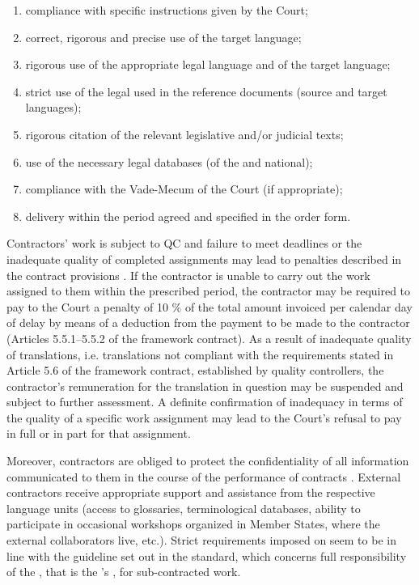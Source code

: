 \documentclass[output=paper]{langsci/langscibook}
\begin{document}
\begin{enumerate}
\item 
compliance with specific instructions given by the Court;
\item 
correct, rigorous and precise use of the target language;
\item 
rigorous use of the appropriate legal language and  of the target language;
\item 
strict use of the legal  used in the reference documents (source and target languages);
\item 
rigorous citation of the relevant legislative and/or judicial texts;
\item 
use of the necessary legal databases (of the  and national);
\item 
compliance with the Vade-Mecum of the Court (if appropriate);
\item 
delivery within the period agreed and specified in the order form. 
\end{enumerate}

Contractors’ work is subject to QC and failure to meet deadlines or the inadequate quality of completed assignments may lead to penalties described in the contract provisions \citep[11]{FCPTS2017}. If the contractor is unable to carry out the work assigned to them within the prescribed period, the contractor may be required to pay to the Court a penalty of 10 \% of the total amount invoiced per calendar day of delay by means of a deduction from the payment to be made to the contractor (Articles 5.5.1–5.5.2 of the framework contract). As a result of inadequate quality of translations, i.e. translations not compliant with the requirements stated in Article 5.6 of the framework contract, established by quality controllers, the contractor’s remuneration for the translation in question may be suspended and subject to further assessment. A definite confirmation of inadequacy in terms of the quality of a specific work assignment may lead to the Court’s refusal to pay in full or in part for that assignment.

Moreover, contractors are obliged to protect the confidentiality of all information communicated to them in the course of the performance of contracts \citep[16]{FCPTS2017}. External contractors receive appropriate support and assistance from the respective language units (access to glossaries, terminological databases, ability to participate in occasional workshops organized in Member States, where the external collaborators live, etc.). Strict requirements imposed on  seem to be in line with the guideline set out in the \citeauthor{ISO2015} standard, which concerns full responsibility of the , that is the ’s , for sub-contracted work.
\end{document}
